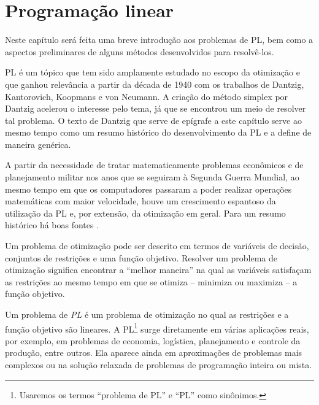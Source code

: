 

\chapter{Programação linear}  
   
\label{chap:linprog}

   Neste capítulo será feita uma breve introdução aos problemas de
 \ac{PL}, bem como a aspectos preliminares de
alguns métodos desenvolvidos para resolvê-los. 

\acl{PL} é um tópico que tem sido amplamente estudado no escopo da otimização e
que ganhou relevância a partir da década de 1940 com os trabalhos de Dantzig,
Kantorovich, Koopmans e von Neumann. A criação do método simplex por Dantzig 
acelerou o interesse pelo tema, já que se encontrou um meio de resolver tal problema. O texto de Dantzig que serve de epígrafe a este capítulo  serve ao mesmo tempo como um resumo histórico do
desenvolvimento da \ac{PL} e a define de maneira genérica.


A partir da necessidade de tratar matematicamente problemas econômicos
e de planejamento militar nos anos que se seguiram à Segunda Guerra Mundial, ao
mesmo tempo em que os computadores passaram a poder realizar operações
matemáticas com maior velocidade, houve um crescimento espantoso da utilização
da \ac{PL} e, por extensão, da otimização em geral. Para um resumo histórico há
boas fontes
\cite{Schrijver:Theory-of-Linear:1986k,Dantzig:Linear-Programming:1963t}.

Um problema de otimização pode ser descrito em termos de variáveis de decisão,
conjuntos de restrições e uma função objetivo. Resolver um problema de
otimização significa encontrar a ``melhor maneira'' na qual as variáveis
satisfaçam as restrições ao mesmo tempo em que se otimiza -- 
minimiza ou maximiza --  a função objetivo. 
 
Um problema de \emph{\acl{PL}}  é um problema de otimização no qual as
restrições e a função objetivo são lineares. A \ac{PL}\footnote{Usaremos
os termos ``problema de PL'' e ``PL'' como sinônimos.} surge diretamente em várias aplicações
reais, por exemplo, em problemas de economia, logística, planejamento e controle
da produção, entre outros. Ela aparece ainda em aproximações de problemas mais
complexos ou na solução relaxada de problemas de programação inteira ou mista.


